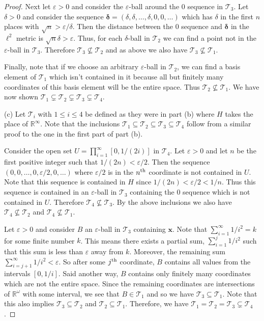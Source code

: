 \documentclass{article}
\begin{document}
\begin{proof}
Next let $\varepsilon > 0$ and consider the $\varepsilon$-ball around the $0$ sequence in $\mathcal{T}_3$. Let $\delta > 0$ and consider the sequence $\mathbf{\delta} = (\delta, \delta, \dots , \delta , 0, 0, \dots )$ which has $\delta$ in the first $n$ places with $\sqrt{n} > \varepsilon/\delta$. Then the distance between the $0$ sequence and $\mathbf{\delta}$ in the $\ell^2$ metric is $\sqrt{n}\delta > \varepsilon$. Thus, for each $\delta$-ball in $\mathcal{T}_2$ we can find a point not in the $\varepsilon$-ball in $\mathcal{T}_3$. Therefore $\mathcal{T}_3 \nsubseteq \mathcal{T}_2$ and as above we also have $\mathcal{T}_3 \nsubseteq \mathcal{T}_1$.

Finally, note that if we choose an arbitrary $\varepsilon$-ball in $\mathcal{T}_2$, we can find a basis element of $\mathcal{T}_1$ which isn't contained in it because all but finitely many coordinates of this basis element will be the entire space. Thus $\mathcal{T}_2 \nsubseteq \mathcal{T}_1$. We have now shown $\mathcal{T}_1 \subsetneq \mathcal{T}_2 \subsetneq \mathcal{T}_3 \subsetneq \mathcal{T}_4$.

(c) Let $\mathcal{T}_i$ with $1 \leq i \leq 4$ be defined as they were in part (b) where $H$ takes the place of $\mathbb{R}^{\infty}$. Note that the inclusions $\mathcal{T}_1 \subseteq \mathcal{T}_2 \subseteq \mathcal{T}_3 \subseteq \mathcal{T}_4$ follow from a similar proof to the one in the first part of part (b).

Consider the open set $U = \prod_{i=1}^{\infty} [0,1/(2i)]$ in $\mathcal{T}_4$. Let $\varepsilon > 0$ and let $n$ be the first positive integer such that $1/(2n) < \varepsilon/2$. Then the sequence $(0,0, \dots ,0,\varepsilon/2,0, \dots)$ where $\varepsilon/2$ is in the $n^{\textup{th}}$ coordinate is not contained in $U$. Note that this sequence is contained in $H$ since $1/(2n) < \varepsilon/2 < 1/n$. Thus this sequence is contained in an $\varepsilon$-ball in $\mathcal{T}_3$ containing the $0$ sequence which is not contained in $U$. Therefore $\mathcal{T}_4 \nsubseteq \mathcal{T}_3$. By the above inclusions we also have $\mathcal{T}_4 \nsubseteq \mathcal{T}_2$ and $\mathcal{T}_4 \nsubseteq \mathcal{T}_1$.

Let $\varepsilon > 0$ and consider $B$ an $\varepsilon$-ball in $\mathcal{T}_3$ containing $\mathbf{x}$. Note that $\sum_{i=1}^{\infty} 1/i^2 = k$ for some finite number $k$. This means there exists a partial sum, $\sum_{i=1}^{j} 1/i^2$ such that this sum is less than $\varepsilon$ away from $k$. Moreover, the remaining sum $\sum_{i=j+1}^{\infty} 1/i^2 < \varepsilon$. So after some $j^{\textup{th}}$ coordinate, $B$ contains all values from the intervals $[0,1/i]$. Said another way, $B$ contains only finitely many coordinates which are not the entire space. Since the remaining coordinates are intersections of $\mathbb{R}^{\omega}$ with some interval, we see that $B \in \mathcal{T}_1$ and so we have $\mathcal{T}_3 \subseteq \mathcal{T}_1$. Note that this also implies $\mathcal{T}_3 \subseteq \mathcal{T}_2$ and $\mathcal{T}_2 \subseteq \mathcal{T}_1$. Therefore, we have $\mathcal{T}_1 = \mathcal{T}_2 = \mathcal{T}_3 \subsetneq \mathcal{T}_4$.
\end{proof}
\end{document}

